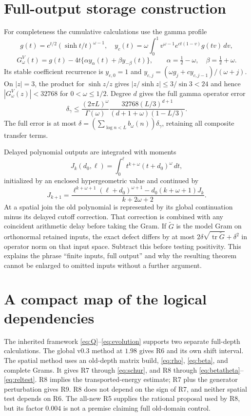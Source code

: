 \documentclass[11pt]{article}
\theoremstyle{remark}\newtheorem{remark}[theorem]{Remark}
\begin{document}
\appendix
\section{Full-output storage construction}\label{app:storage}

For completeness the cumulative calculations use the gamma profile
\[
 g(t)=e^{t/2}(\sinh t/t)^{\omega-1},\quad
 y_c(t)=\omega\int_0^1v^{\omega-1}e^{ct(1-v)}g(tv)\,dv,
\]
\[
 G^V_\omega(t)=g(t)-4t\{\alpha y_\alpha(t)+\beta y_{-\beta}(t)\},\qquad
 \alpha=\tfrac12-\omega,\quad\beta=\tfrac12+\omega.
\]
Its stable coefficient recurrence is $y_{c,0}=1$ and
$y_{c,j}=(\omega g_j+cy_{c,j-1})/(\omega+j)$. On $|z|=3$, the product for $\sinh z/z$ gives $|z/\sinh z|\le3/\sin3<24$ and hence $|G^V_\omega(z)|<32768$ for $0<\omega\le1/2$. Degree $d$ gives the full gamma operator error
\[
 \delta_\gamma\le\frac{(2\pi L)^\omega}{\Gamma(\omega)}
 \frac{32768(L/3)^{d+1}}{(d+1+\omega)(1-L/3)}.
\]
The full error is at most $\delta=(\sum_{\log n<L}b_\omega(n))\delta_\gamma$, retaining all composite transfer terms.

Delayed polynomial outputs are integrated with moments
\[
 J_k(d_0,\ell)=\int_0^\ell t^{k+\omega}(t+d_0)^\omega\,dt,
\]
initialized by an enclosed hypergeometric value and continued by
\[
 J_{k+1}=\frac{\ell^{k+\omega+1}(\ell+d_0)^{\omega+1}-d_0(k+\omega+1)J_k}{k+2\omega+2}.
\]
At a spatial join the old polynomial is represented by its global continuation minus its delayed cutoff correction. That correction is combined with any coincident arithmetic delay before taking the Gram. If $\widetilde G$ is the model Gram on orthonormal retained inputs, the exact defect differs by at most
$2\delta\sqrt{\operatorname{tr}\widetilde G}+\delta^2$ in operator norm on that input space. Subtract this before testing positivity. This explains the phrase ``finite inputs, full output'' and why the resulting theorem cannot be enlarged to omitted inputs without a further argument.

\section{A compact map of the logical dependencies}

The inherited framework \eqref{eq:Q}--\eqref{eq:evolution} supports two separate full-depth calculations. The global v0.3 method at $1.98$ gives R6 and its own shift interval. The spatial method uses an old-depth matrix build, \eqref{eq:rho}, \eqref{eq:beta}, and complete Grams. It gives R7 through \eqref{eq:schur}, and R8 through \eqref{eq:betatheta}--\eqref{eq:reltest}. R8 implies the transported-energy estimate; R7 plus the generator perturbation gives R9. R8 does not depend on the sign of R7, and neither spatial test depends on R6. The all-new R5 supplies the rational proposal used by R8, but its factor $0.004$ is not a premise claiming full old-domain control.
\end{document}
